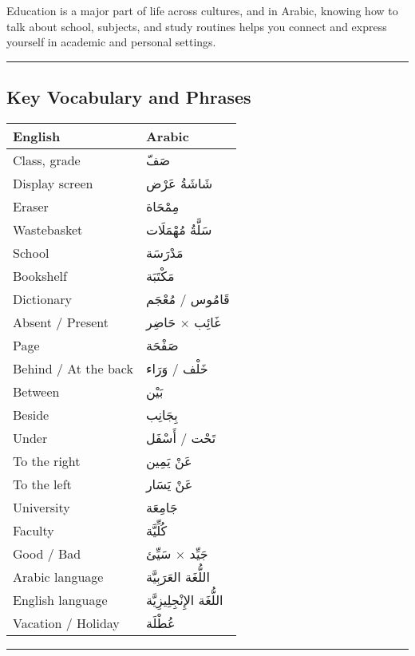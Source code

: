 \documentclass[
  a4paper,
  DIV=11,
  numbers=noendperiod]{scrartcl}
\begin{document}
Education is a major part of life across cultures, and in Arabic,
knowing how to talk about school, subjects, and study routines helps you
connect and express yourself in academic and personal settings.

\begin{center}\rule{0.5\linewidth}{0.5pt}\end{center}

\subsection{Key Vocabulary and
Phrases}\label{key-vocabulary-and-phrases-2}

\begin{longtable}[]{@{}ll@{}}
\toprule\noalign{}
English & Arabic \\
\midrule\noalign{}
\endhead
\bottomrule\noalign{}
\endlastfoot
Class, grade & صَفّ \\
Display screen & شَاشَةُ عَرْض \\
Eraser & مِمْحَاة \\
Wastebasket & سَلَّةُ مُهْمَلَات \\
School & مَدْرَسَة \\
Bookshelf & مَكْتَبَة \\
Dictionary & قَامُوس / مُعْجَم \\
Absent / Present & غَائِب × حَاضِر \\
Page & صَفْحَة \\
Behind / At the back & خَلْف / وَرَاء \\
Between & بَيْن \\
Beside & بِجَانِب \\
Under & تَحْت / أَسْفَل \\
To the right & عَنْ يَمِين \\
To the left & عَنْ يَسَار \\
University & جَامِعَة \\
Faculty & كُلِّيَّة \\
Good / Bad & جَيِّد × سَيِّئ \\
Arabic language & اللُّغَة العَرَبِيَّة \\
English language & اللُّغَة الإِنْجِلِيزِيَّة \\
Vacation / Holiday & عُطْلَة \\
\end{longtable}

\begin{center}\rule{0.5\linewidth}{0.5pt}\end{center}
\end{document}
